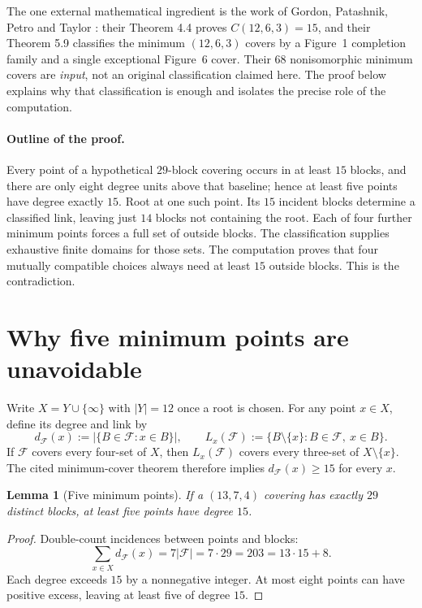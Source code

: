\documentclass[11pt]{article}
\newcommand{\coverfam}{\mathcal F}
\newtheorem{lemma}[theorem]{Lemma}
\theoremstyle{definition}
\theoremstyle{remark}
\begin{document}
The one external mathematical ingredient is the work of Gordon,
Patashnik, Petro and Taylor \cite{GPPT}: their Theorem 4.4 proves
$C(12,6,3)=15$, and their Theorem 5.9 classifies the minimum
$(12,6,3)$ covers by a Figure~1 completion family and a single
exceptional Figure~6 cover. Their $68$ nonisomorphic minimum covers
are \emph{input}, not an original classification claimed here.
The proof below explains why that classification is enough and
isolates the precise role of the computation.

\paragraph{Outline of the proof.}
Every point of a hypothetical $29$-block covering occurs in at least
$15$ blocks, and there are only eight degree units above that baseline;
hence at least five points have degree exactly $15$. Root at one such
point. Its $15$ incident blocks determine a classified link, leaving
just $14$ blocks not containing the root. Each of four further minimum
points forces a full set of outside blocks. The classification supplies
exhaustive finite domains for those sets. The computation proves that
four mutually compatible choices always need at least $15$ outside
blocks. This is the contradiction.

\section{Why five minimum points are unavoidable}
Write $X=Y\cup\{\infty\}$ with $|Y|=12$ once a root is chosen.
For any point $x\in X$, define its degree and link by
\[
 d_\coverfam(x):=|\{B\in\coverfam:x\in B\}|,\qquad
 L_x(\coverfam):=\{B\setminus\{x\}:B\in\coverfam,\ x\in B\}.
\]
If $\coverfam$ covers every four-set of $X$, then $L_x(\coverfam)$ covers every
three-set of $X\setminus\{x\}$. The cited minimum-cover theorem
therefore implies $d_\coverfam(x)\geq15$ for every $x$.

\begin{lemma}[Five minimum points]\label{lem:five}
If a $(13,7,4)$ covering has exactly $29$ distinct blocks, at least
five points have degree $15$.
\end{lemma}
\begin{proof}
Double-count incidences between points and blocks:
\[
 \sum_{x\in X}d_\coverfam(x)=7|\coverfam|=7\cdot29=203
 =13\cdot15+8.
\]
Each degree exceeds $15$ by a nonnegative integer. At most eight
points can have positive excess, leaving at least five of degree $15$.
\end{proof}
\end{document}
